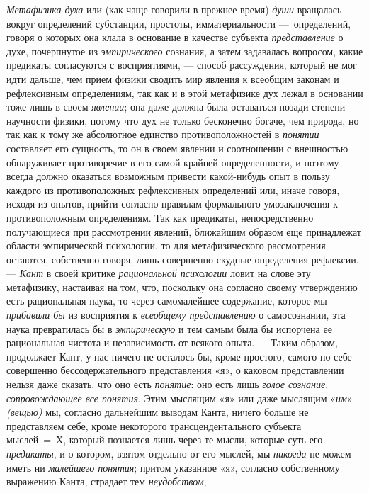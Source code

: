 \documentclass[twoside]{article}
\begin{document}
{{{\em Метафизика духа} или
(как чаще говорили в прежнее время)
{\em души} вращалась
вокруг определений субстанции, простоты, имматериальности
—~определений, говоря о которых она клала в основание в
качестве субъекта {\em представление}
о духе, почерпнутое из
{\em эмпирического}
сознания, а затем задавалась вопросом, какие предикаты
согласуются с восприятиями, — способ рассуждения, который не
мог идти дальше, чем прием физики сводить мир явления к всеобщим законам и
рефлексивным определениям, так как и в этой метафизике дух лежал в
основании тоже лишь в своем
{\em явлении}; она даже
должна была оставаться позади степени научности физики,
потому что дух не только бесконечно богаче, чем природа, но
так как к тому же абсолютное единство противоположностей в
{\em понятии} составляет
его сущность, то он в своем явлении и соотношении с внешностью обнаруживает
противоречие в его самой крайней определенности, и поэтому всегда должно
оказаться возможным привести какой-нибудь опыт в пользу каждого из
противоположных рефлексивных определений или, иначе говоря, исходя из
опытов, прийти согласно правилам формального умозаключения к
противоположным определениям. Так как предикаты, непосредственно
получающиеся при рассмотрении явлений, ближайшим образом еще принадлежат
области эмпирической психологии, то для метафизического рассмотрения
остаются, собственно говоря, лишь совершенно скудные определения
рефлексии. — {\em Кант} в
своей критике {\em рациональной
психологии} ловит на слове эту метафизику, настаивая на том,
что, поскольку она согласно своему утверждению есть рациональная наука, то
через самомалейшее содержание, которое мы
{\em прибавили бы} из
восприятия к {\em всеобщему
представлению} о самосознании, эта наука превратилась бы в
{\em эмпирическую} и тем
самым была бы испорчена ее рациональная чистота и независимость от всякого
опыта. — Таким образом, продолжает Кант, у нас ничего не
осталось бы, кроме простого, самого по себе совершенно бессодержательного
представления «я», о каковом представлении нельзя даже сказать, что оно
есть {\em понятие}: оно
есть лишь {\em голое сознание},
{\em сопровождающее все понятия}.
Этим мыслящим «я» или даже мыслящим
«{\em им}»
{\em (вещью)} мы, согласно
дальнейшим выводам Канта, ничего больше не представляем себе, кроме
некоторого трансцендентального субъекта мыслей~=~Х, который познается лишь
через те мысли, которые суть его
{\em предикаты}, и о
котором, взятом отдельно от его мыслей, мы
{\em никогда} не можем
иметь ни {\em малейшего понятия};
притом указанное «я», согласно собственному выражению Канта,
страдает тем {\em неудобством},
}}
\end{document}
